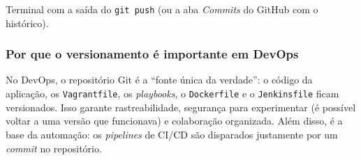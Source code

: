 %
  {Terminal com a saída do \texttt{git push} (ou a aba \textit{Commits} do GitHub com o histórico).}

\subsubsection{Por que o versionamento é importante em DevOps}

No DevOps, o repositório Git é a ``fonte única da verdade'': o código da aplicação, os
\texttt{Vagrantfile}, os \textit{playbooks}, o \texttt{Dockerfile} e o \texttt{Jenkinsfile} ficam
versionados. Isso garante rastreabilidade, segurança para experimentar (é possível voltar a uma versão
que funcionava) e colaboração organizada. Além disso, é a base da automação: os \textit{pipelines} de
CI/CD são disparados justamente por um \textit{commit} no repositório.
